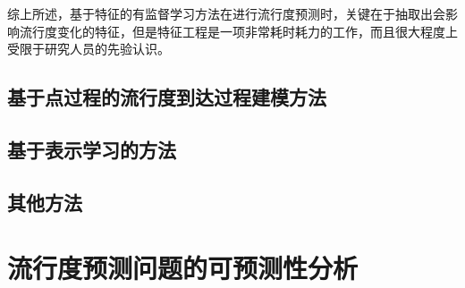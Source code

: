 综上所述，基于特征的有监督学习方法在进行流行度预测时，关键在于抽取出会影响流行度变化的特征，但是特征工程是一项非常耗时耗力的工作，而且很大程度上受限于研究人员的先验认识。

\subsection{基于点过程的流行度到达过程建模方法}
\subsection{基于表示学习的方法}
\subsection{其他方法}
\section{流行度预测问题的可预测性分析}

